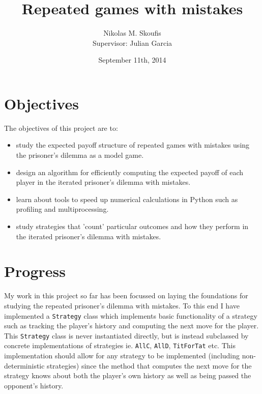 \documentclass[a4paper,11pt]{article}
\begin{document}
\title{Repeated games with mistakes}
\author{Nikolas M. Skoufis \\ Supervisor: Julian Garcia}
\date{September 11th, 2014}

\maketitle

\section*{Objectives}

The objectives of this project are to:

\begin{itemize}

    \item study the expected payoff structure of repeated games with mistakes using the prisoner's dilemma as a model game.
    \item design an algorithm for efficiently computing the expected payoff of each player in the iterated prisoner's dilemma with mistakes.
    \item learn about tools to speed up numerical calculations in Python such as profiling and multiprocessing.
    \item study strategies that 'count' particular outcomes and how they perform in the iterated prisoner's dilemma with mistakes.

\end{itemize}

\section*{Progress}

My work in this project so far has been focussed on laying the foundations for studying the repeated prisoner's dilemma with mistakes.
To this end I have implemented a \texttt{Strategy} class which implements basic functionality of a strategy such as tracking the player's history and computing the next move for the player.
This \texttt{Strategy} class is never instantiated directly, but is instead subclassed by concrete implementations of strategies ie. \texttt{AllC}, \texttt{AllD}, \texttt{TitForTat} etc.
This implementation should allow for any strategy to be implemented (including non-deterministic strategies) since the method that computes the next move for the strategy knows about both the player's own history as well as being passed the opponent's history.
\end{document}
